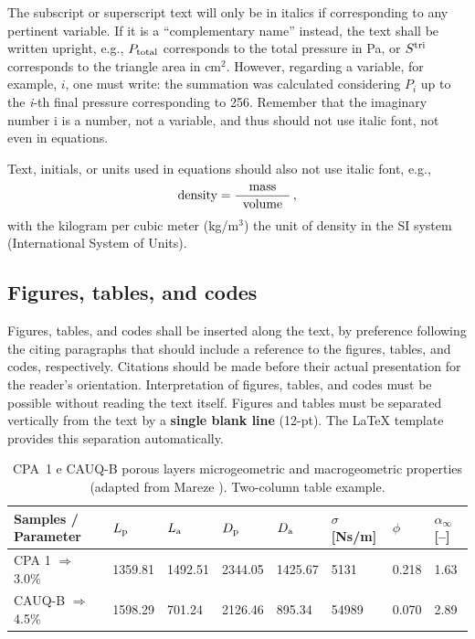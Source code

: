 \documentclass[12pt, a4paper, twoside, twocolumn]{article}
\begin{document}
The subscript or superscript text will only be in italics if corresponding to any pertinent variable. If it is a ``complementary name'' instead, the text shall be written upright, e.g., $P_{\text{total}}$ corresponds to the total pressure in Pa, or $S^{\text{tri}}$ corresponds to the triangle area in cm$^2$. However, regarding a variable, for example, $i$, one must write: the summation was calculated considering $P_i$ up to the \textit{i}-th final pressure corresponding to 256. Remember that the imaginary number i is a number, not a variable, and thus should not use italic font, not even in equations.

Text, initials, or units used in equations should also not use italic font, e.g.,
%
\begin{equation}
	\text{density} = \frac{\text{mass}}{\;\;\text{volume}\;\;}\,,
\label{eq:densidade}
\end{equation}
%
with the kilogram per cubic meter (kg/m$^3$) the unit of density in the SI system (International System of Units).

\subsection{Figures, tables, and codes}

Figures, tables, and codes shall be inserted along the text, by preference following the citing paragraphs that should include a reference to the figures, tables, and codes, respectively. Citations should be made before their actual presentation for the reader's orientation. Interpretation of figures, tables, and codes must be possible without reading the text itself. Figures and tables must be separated vertically from the text by a \textbf{single blank line} (12-pt). The \LaTeX{} template provides this separation automatically.

\begin{table}[!b]
  \centering {} 
  \caption{CPA~1 e CAUQ-B porous layers microgeometric and macrogeometric properties\\ (adapted from Mareze \etal \cite{Mareze-2017}). Two-column table example.}
	\fontsize{11}{12}\selectfont 
    \begin{tabular}{C{2.9cm} | C{1.5cm} | C{1.5cm} | C{1.5cm} | C{1.5cm} | C{1.5cm} | C{1.0cm}| C{1.0cm}}
    \toprule
    \textbf{ Samples / Parameter } & $L_{\text{p}}$ \qquad [$\upmu$\! m] & $L_{\text{a}}$ \qquad [$\upmu$\! m] & $D_{\text{p}}$ \qquad [$\upmu$\! m] & $D_{\text{a}}$ \qquad [$\upmu$\! m] & $\sigma$ [Ns/m] & {$\phi$\quad [--]} & $\alpha_{\infty}$ [--]\\
	  \midrule
		CPA 1 $\Rightarrow$  3.0\% &	1359.81 & 1492.51 & 2344.05 & 1425.67 &	5131 &	0.218 &	1.63\\
		 CAUQ-B $\Rightarrow$ 4.5\%	& 1598.29 &	701.24 & 2126.46 & 895.34 &	54989 &	0.070 &	2.89\\
    \bottomrule
    \end{tabular}
    \label{tab.exemplo}%
\end{table}%
\end{document}
